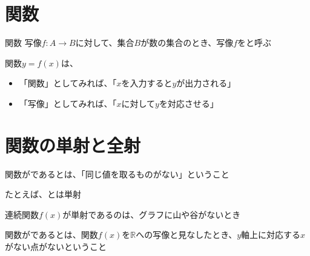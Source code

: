 \documentclass[../../../topic_mapping]{subfiles}
\begin{document}
\sectionline
\section{関数}

\begin{definition}{関数}
  写像$f\colon A \to B$に対して、集合$B$が数の集合のとき、写像$f$をと呼ぶ
\end{definition}

関数$y=f(x)$は、
\begin{itemize}
  \item 「関数」としてみれば、「$x$を入力すると$y$が出力される」
  \item 「写像」としてみれば、「$x$に対して$y$を対応させる」
\end{itemize}

\sectionline
\section{関数の単射と全射}

関数がであるとは、「同じ値を取るものがない」ということ

たとえば、とは単射

連続関数$f(x)$が単射であるのは、グラフに山や谷がないとき

\sectionline

関数がであるとは、関数$f(x)$を$\mathbb{R}$への写像と見なしたとき、$y$軸上に対応する$x$がない点がないということ
\end{document}
